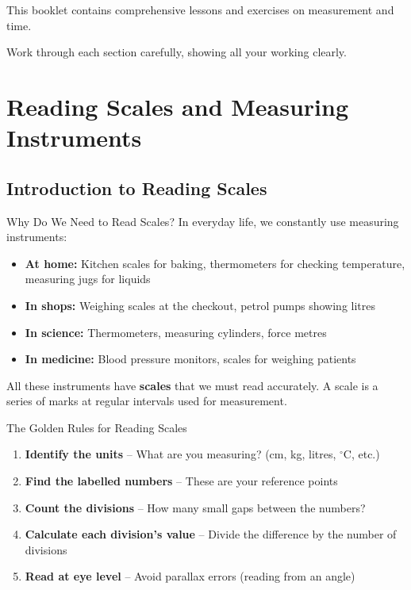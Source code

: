 \documentclass[12pt,a4paper]{article}
\newcommand{\degC}{$^\circ$C}
\begin{document}
\begin{titlepage}
\begin{center}
\vfill

{\large This booklet contains comprehensive lessons and exercises on measurement and time.\par}
\vspace{0.3cm}
{\large Work through each section carefully, showing all your working clearly.\par}

\end{center}
\end{titlepage}

\tableofcontents
\newpage

\section{Reading Scales and Measuring Instruments}

\subsection{Introduction to Reading Scales}

\begin{conceptbox}{Why Do We Need to Read Scales?}
In everyday life, we constantly use measuring instruments:
\begin{itemize}[leftmargin=*]
\item \textbf{At home:} Kitchen scales for baking, thermometers for checking temperature, measuring jugs for liquids
\item \textbf{In shops:} Weighing scales at the checkout, petrol pumps showing litres
\item \textbf{In science:} Thermometers, measuring cylinders, force metres
\item \textbf{In medicine:} Blood pressure monitors, scales for weighing patients
\end{itemize}

All these instruments have \textbf{scales} that we must read accurately. A scale is a series of marks at regular intervals used for measurement.
\end{conceptbox}

\begin{tipbox}{The Golden Rules for Reading Scales}
\begin{enumerate}[leftmargin=*]
\item \textbf{Identify the units} -- What are you measuring? (cm, kg, litres, \degC, etc.)
\item \textbf{Find the labelled numbers} -- These are your reference points
\item \textbf{Count the divisions} -- How many small gaps between the numbers?
\item \textbf{Calculate each division's value} -- Divide the difference by the number of divisions
\item \textbf{Read at eye level} -- Avoid parallax errors (reading from an angle)
\end{enumerate}
\end{tipbox}
\end{document}
